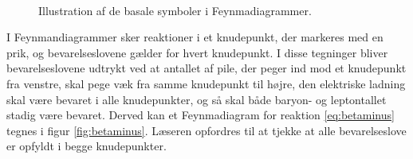 \begin{figure}
    \centering
    \begin{subfigure}{.2\textwidth}
        \centering
    \end{subfigure}
    \hspace{5mm}
    \begin{subfigure}{.2\textwidth}
        \centering
    \end{subfigure}
    \\
    \vspace{1cm}
    \begin{subfigure}{.2\textwidth}
        \centering
    \end{subfigure}
    \hspace{5mm}
    \begin{subfigure}{.2\textwidth}
        \centering
    \end{subfigure}
    \hspace{5mm}
    \begin{subfigure}{.2\textwidth}
        \centering
    \end{subfigure}
    \caption{Illustration af de basale symboler i Feynmadiagrammer.}
    \label{fig:Feynmandiagramkomponenter}
\end{figure}
%
I Feynmandiagrammer sker reaktioner i et knudepunkt, der markeres med en prik, og bevarelseslovene gælder for hvert knudepunkt. I disse tegninger bliver bevarelseslovene udtrykt ved at antallet af pile, der peger ind mod et knudepunkt fra venstre, skal pege væk fra samme knudepunkt til højre, den elektriske ladning skal være bevaret i alle knudepunkter, og så skal både baryon- og leptontallet stadig være bevaret. Derved kan et Feynmadiagram for reaktion \eqref{eq:betaminus} tegnes i figur \ref{fig:betaminus}. Læseren opfordres til at tjekke at alle bevarelseslove er opfyldt i begge knudepunkter.
